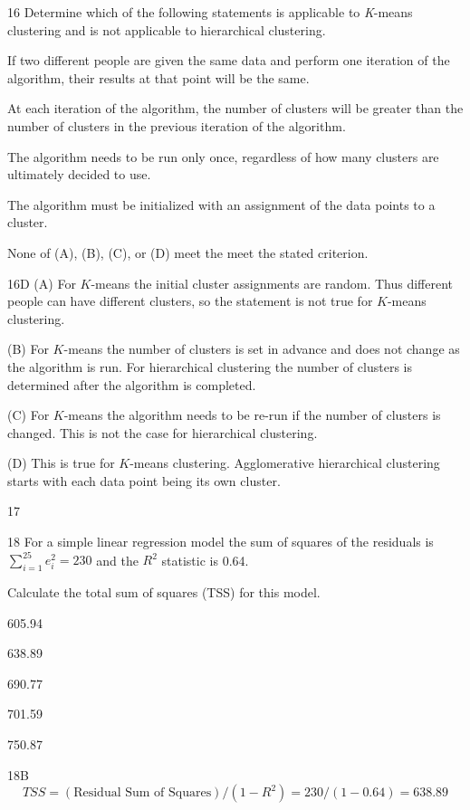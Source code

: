 \begin{question}{16}
Determine which of the following statements is applicable to \textit{K}-means clustering and is not applicable to hierarchical clustering.

\begin{choices}
\item If two different people are given the same data and perform one iteration of the algorithm, their results at that point will be the same.
\item At each iteration of the algorithm, the number of clusters will be greater than the number of clusters in the previous iteration of the algorithm.
\item The algorithm needs to be run only once, regardless of how many clusters are ultimately decided to use.
\item The algorithm must be initialized with an assignment of the data points to a cluster.
\item None of (A), (B), (C), or (D) meet the meet the stated criterion.
\end{choices}
\end{question}
\begin{solution}{16}{D}
(A) For $K$-means the initial cluster assignments are random. Thus different people can have different clusters, so the statement is not true for $K$-means clustering.

(B) For $K$-means the number of clusters is set in advance and does not change as the algorithm is run. For hierarchical clustering the number of clusters is determined after the algorithm is completed.

(C) For $K$-means the algorithm needs to be re-run if the number of clusters is changed. This is not the case for hierarchical clustering.

(D) This is true for $K$-means clustering. Agglomerative hierarchical clustering starts with each data point being its own cluster.
\end{solution}

\begin{question}{17}
\deleted
\end{question}

\begin{question}{18}
For a simple linear regression model the sum of squares of the residuals is $\sum_{i=1}^{25} e_i^2 = 230$ and the $R^2$ statistic is 0.64.

Calculate the total sum of squares (TSS) for this model.

\begin{choices}
\item 605.94
\item 638.89
\item 690.77
\item 701.59
\item 750.87
\end{choices}
\end{question}
\begin{solution}{18}{B}
\[ TSS = (\text{Residual Sum of Squares})/(1 - R^2) = 230/(1 - 0.64) = 638.89 \]
\end{solution}

